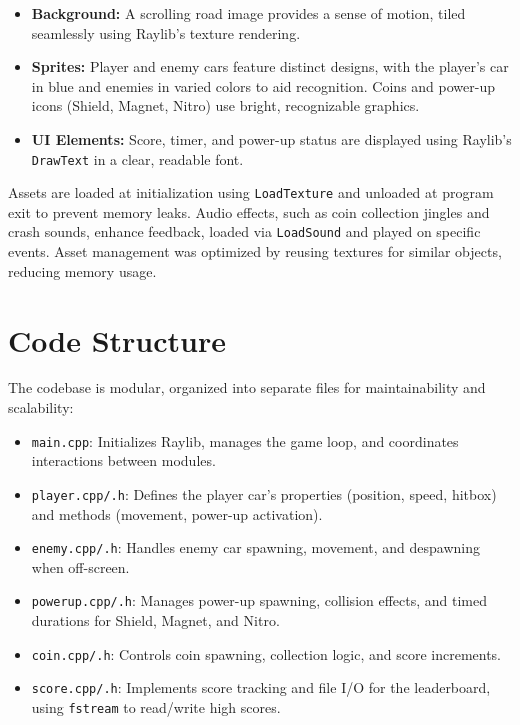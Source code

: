 \documentclass[12pt,a4paper]{article}
\begin{document}
\begin{itemize}
    \item \textbf{Background:} A scrolling road image provides a sense of motion, tiled seamlessly using Raylib’s texture rendering. \\
    \item \textbf{Sprites:} Player and enemy cars feature distinct designs, with the player’s car in blue and enemies in varied colors to aid recognition. Coins and power-up icons (Shield, Magnet, Nitro) use bright, recognizable graphics. \\
    \item \textbf{UI Elements:} Score, timer, and power-up status are displayed using Raylib’s \texttt{DrawText} in a clear, readable font. \\
\end{itemize}

Assets are loaded at initialization using \texttt{LoadTexture} and unloaded at program exit to prevent memory leaks. Audio effects, such as coin collection jingles and crash sounds, enhance feedback, loaded via \texttt{LoadSound} and played on specific events. Asset management was optimized by reusing textures for similar objects, reducing memory usage. \\

\section{Code Structure}

The codebase is modular, organized into separate files for maintainability and scalability: \\

\begin{itemize}
    \item \texttt{main.cpp}: Initializes Raylib, manages the game loop, and coordinates interactions between modules. \\
    \item \texttt{player.cpp/.h}: Defines the player car’s properties (position, speed, hitbox) and methods (movement, power-up activation). \\
    \item \texttt{enemy.cpp/.h}: Handles enemy car spawning, movement, and despawning when off-screen. \\
    \item \texttt{powerup.cpp/.h}: Manages power-up spawning, collision effects, and timed durations for Shield, Magnet, and Nitro. \\
    \item \texttt{coin.cpp/.h}: Controls coin spawning, collection logic, and score increments. \\
    \item \texttt{score.cpp/.h}: Implements score tracking and file I/O for the leaderboard, using \texttt{fstream} to read/write high scores. \\
\end{itemize}
\end{document}
